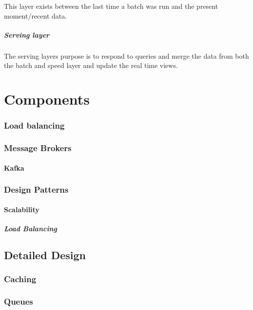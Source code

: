 \documentclass[a4paper, 11pt]{book}
\begin{document}
    This layer exists between the last time a batch was run and the present moment/recent data.

    \paragraph{Serving layer}
    The serving layers purpose is to respond to queries and merge the data from both the batch and speed layer and update the real time views.

    \chapter{Components}

    \subsection{Load balancing}

    \subsection{Message Brokers}

    \subsubsection{Kafka}

    \subsection{Design Patterns}

    \subsubsection{Scalability}

    \paragraph{Load Balancing}

    \section{Detailed Design}

    \subsection{Caching}

    \subsection{Queues}
\end{document}
